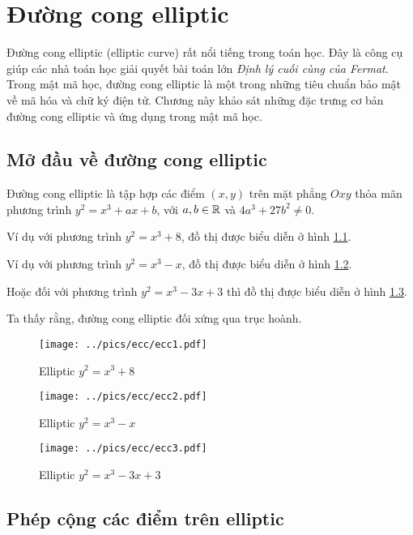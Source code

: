 \chapter{Đường cong elliptic}

Đường cong elliptic (elliptic curve) rất nổi tiếng trong toán học. Đây là
công cụ giúp các nhà toán học giải quyết bài toán lớn \textit{Định lý 
cuối cùng của Fermat}. Trong mật mã học, đường cong elliptic là một
trong những tiêu chuẩn bảo mật về mã hóa và chữ ký điện tử. Chương này 
khảo sát những đặc trưng cơ bản đường cong elliptic và ứng dụng trong
mật mã học.

\section{Mở đầu về đường cong elliptic}

Đường cong elliptic là tập hợp các điểm $(x, y)$ trên mặt phẳng $Oxy$
thỏa mãn phương trình $y^2 = x^3 + ax + b$, với $a, b \in \mathbb{R}$ và
$4a^3 + 27b^2 \neq 0$.

Ví dụ với phương trình $y^2 = x^3 + 8$, đồ thị được biểu diễn 
ở hình \ref{ecc:1}.

Ví dụ với phương trình $y^2 = x^3 - x$, đồ thị được biểu diễn
ở hình \ref{ecc:2}.

Hoặc đối với phương trình $y^2 = x^3 - 3x + 3$ thì đồ thị được biểu diễn
ở hình \ref{ecc:3}.

Ta thấy rằng, đường cong elliptic đối xứng qua trục hoành.

\begin{figure}[ht]
    \centering
    \texttt{[image: ../pics/ecc/ecc1.pdf]}
    \caption{Elliptic $y^2 = x^3 + 8$}
    \label{ecc:1}
\end{figure}

\begin{figure}[ht]
    \centering
    \texttt{[image: ../pics/ecc/ecc2.pdf]}
    \caption{Elliptic $y^2 = x^3 - x$}
    \label{ecc:2}
\end{figure}

\begin{figure}[ht]
    \centering
    \texttt{[image: ../pics/ecc/ecc3.pdf]}
    \caption{Elliptic $y^2 = x^3 - 3x + 3$}
    \label{ecc:3}
\end{figure}

\section{Phép cộng các điểm trên elliptic}

